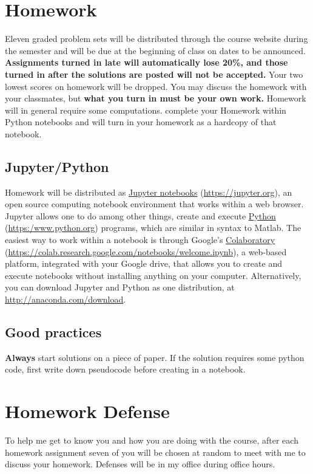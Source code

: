 \documentclass[11pt]{article}
\begin{document}
\section{Homework}
\label{sec:orgd8e5af3}
Eleven graded problem sets will be distributed through the course website during the semester and will be due at the beginning of class on dates to be announced.  \textbf{Assignments turned in late will automatically lose 20\%, and those turned in after the solutions are posted will not be accepted.}  Your two lowest scores on homework will be dropped.  You may discuss the homework with your classmates, but \textbf{what you turn in must be your own work.} Homework will in general require some computations. complete your Homework within Python notebooks and will turn in your homework as a hardcopy of that notebook.

\subsection{Jupyter/Python}
\label{sec:org3903b13}
Homework will be distributed as \href{https://jupyter.org/}{Jupyter notebooks} (\url{https://jupyter.org}), an open source computing notebook environment that works within a web browser. Jupyter allows one to do among other things, create and execute \href{https://www.python.org/}{Python} (\url{https:/www.python.org}) programs, which are similar in syntax to Matlab. The easiest way to work within a notebook is through Google's \href{https://colab.research.google.com/notebooks/welcome.ipynb}{Colaboratory} (\url{https://colab.research.google.com/notebooks/welcome.ipynb}), a web-based platform, integrated with your Google drive, that allows you to create and execute notebooks without installing anything on your computer. Alternatively, you can download Jupyter and Python as one distribution, at \url{http://anaconda.com/download}. 

\subsection{Good practices}
\label{sec:orgd278f3c}
\textbf{Always} start solutions on a piece of paper. If the solution requires some python code, first write down pseudocode before creating in a notebook.

\section{Homework Defense}
\label{sec:orgde2c692}
To help me get to know you and how you are doing with the course, after each homework assignment seven of you will be chosen at random to meet with me to discuss your homework. Defenses will be in my office during office hours.
\end{document}
